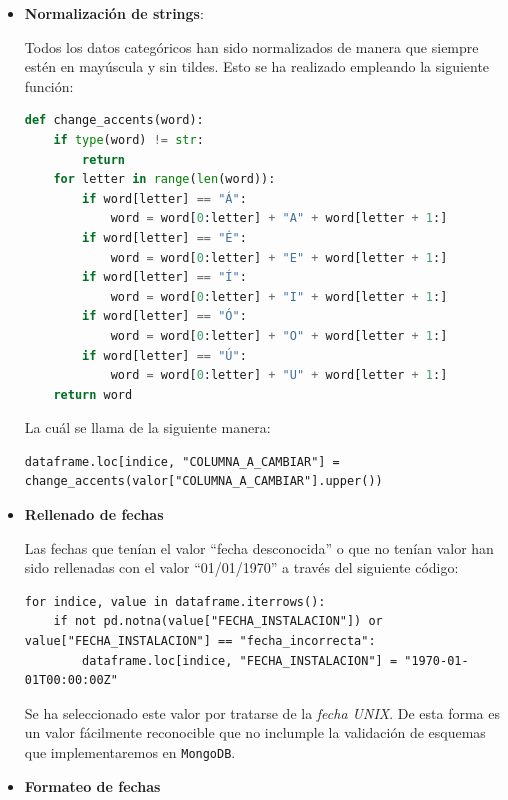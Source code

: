 \documentclass[]{article}
\begin{document}
\begin{itemize}
    \item \textbf{Normalización de strings}:

    Todos los datos categóricos han sido normalizados de manera que siempre estén en mayúscula y sin tildes. Esto se ha realizado empleando la siguiente función:

    \begin{lstlisting}[language=Python,caption=Eliminación de tildes]
def change_accents(word):
    if type(word) != str:
        return
    for letter in range(len(word)):
        if word[letter] == "Á":
            word = word[0:letter] + "A" + word[letter + 1:]
        if word[letter] == "É":
            word = word[0:letter] + "E" + word[letter + 1:]
        if word[letter] == "Í":
            word = word[0:letter] + "I" + word[letter + 1:]
        if word[letter] == "Ó":
            word = word[0:letter] + "O" + word[letter + 1:]
        if word[letter] == "Ú":
            word = word[0:letter] + "U" + word[letter + 1:]
    return word
    \end{lstlisting}

    La cuál se llama de la siguiente manera:

    \begin{lstlisting}[caption=Capitalización de strings y eliminacion de tildes]
dataframe.loc[indice, "COLUMNA_A_CAMBIAR"] = change_accents(valor["COLUMNA_A_CAMBIAR"].upper())
    \end{lstlisting}

    \item \textbf{Rellenado de fechas}

    Las fechas que tenían el valor ``fecha desconocida'' o que no tenían valor han sido rellenadas con el valor ``01/01/1970'' a través del siguiente código:

    \begin{lstlisting}[caption=Imputacion de fechas incorrectas o faltantes]
for indice, value in dataframe.iterrows():
    if not pd.notna(value["FECHA_INSTALACION"]) or value["FECHA_INSTALACION"] == "fecha_incorrecta":
        dataframe.loc[indice, "FECHA_INSTALACION"] = "1970-01-01T00:00:00Z"
    \end{lstlisting}

    Se ha seleccionado este valor por tratarse de la \textit{fecha UNIX}. De
    esta forma es un valor fácilmente reconocible que no inclumple la validación
    de esquemas que implementaremos en \texttt{MongoDB}.

    \item \textbf{Formateo de fechas}


\end{itemize}
\end{document}
